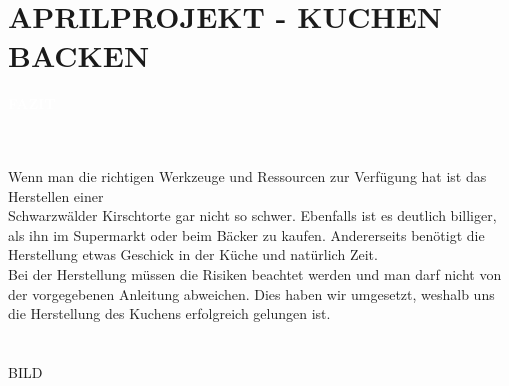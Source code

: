 \documentclass[a4paper, 12 pt]{article}
\newcommand{\coloredSectionDark}[1]{{\small \colorbox{DodgerBlue2}{\begin{minipage}{0.99\textwidth}{\textbf{#1 \vphantom{p\^{E}}}}\end{minipage}}}}
\begin{document}
\section*{\textcolor{DodgerBlue2}{APRILPROJEKT - KUCHEN BACKEN}}

\noindent
\coloredSectionDark{\textbf{\textcolor{white}{FAZIT}}}\\[-0.3cm]
\\
Wenn man die richtigen Werkzeuge und Ressourcen zur Verfügung hat ist das Herstellen einer \\
Schwarzwälder Kirschtorte gar nicht so schwer.
Ebenfalls ist es deutlich billiger, als ihn im Supermarkt oder beim Bäcker zu kaufen. Andererseits benötigt die Herstellung etwas Geschick in der Küche
und natürlich Zeit. \\
Bei der Herstellung müssen die Risiken beachtet werden und man darf nicht von der vorgegebenen Anleitung abweichen. Dies haben wir umgesetzt, weshalb uns
die Herstellung des Kuchens erfolgreich gelungen ist.
\\\\\\
BILD
\end{document}
